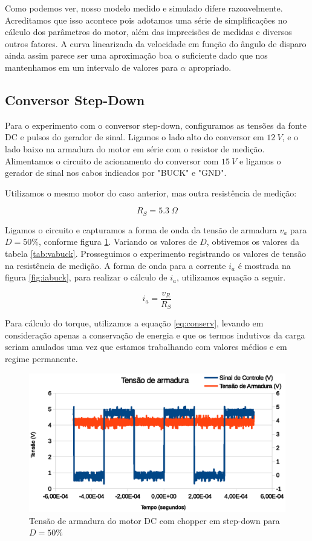 \documentclass{article}
\begin{document}
Como podemos ver, nosso modelo medido e simulado difere razoavelmente. Acreditamos que isso acontece pois adotamos uma série de simplificações no cálculo dos parâmetros do motor, além das imprecisões de medidas e diversos outros fatores. A curva linearizada da velocidade em função do ângulo de disparo ainda assim parece ser uma aproximação boa o suficiente dado que nos mantenhamos em um intervalo de valores para $\alpha$ apropriado.
\subsection{Conversor Step-Down}
Para o experimento com o conversor step-down, configuramos as tensões da fonte DC e pulsos do gerador de sinal. Ligamos o lado alto do conversor em $12\ V$, e o lado baixo na armadura do motor em série com o resistor de medição. Alimentamos o circuito de acionamento do conversor com $15\ V$ e ligamos o gerador de sinal nos cabos indicados por "BUCK" e "GND".

Utilizamos o mesmo motor do caso anterior, mas outra resistência de medição:

\begin{equation}
R_S=5.3\ \Omega
\end{equation}

Ligamos o circuito e capturamos a forma de onda da tensão de armadura $v_a$ para $D=50\%$, conforme figura \ref{fig:vabuck}. Variando os valores de $D$, obtivemos os valores da tabela \ref{tab:vabuck}. Prosseguimos o experimento registrando os valores de tensão na resistência de medição. A forma de onda para a corrente $i_a$ é mostrada na figura \ref{fig:iabuck}, para realizar o cálculo de $i_a$, utilizamos equação a seguir.

\begin{equation}
i_a=\frac{v_R}{R_S}
\end{equation}

Para cálculo do torque, utilizamos a equação \ref{eq:conserv}, levando em consideração apenas a conservação de energia e que os termos indutivos da carga seriam anulados uma vez que estamos trabalhando com valores médios e em regime permanente.

\begin{figure}[H]
	\centering
	\includegraphics[width=\linewidth]{Dados/Buck/va}
	\caption{Tensão de armadura do motor DC com chopper em step-down para $D=50\%$}
	\label{fig:vabuck}
\end{figure}
\end{document}
